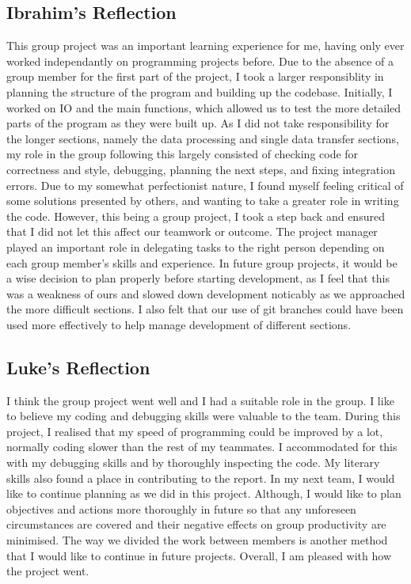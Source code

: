 \documentclass[11pt]{article}
\begin{document}
\subsection{Ibrahim's Reflection}
This group project was an important learning experience for me, having only ever worked independantly on programming projects before. Due to the absence of a group member for the first part of the project, I took a larger responsiblity in planning the structure of the program and building up the codebase. Initially, I worked on IO and the main functions, which allowed us to test the more detailed parts of the program as they were built up. As I did not take responsibility for the longer sections, namely the data processing and single data transfer sections, my role in the group following this largely consisted of checking code for correctness and style, debugging, planning the next steps, and fixing integration errors. Due to my somewhat perfectionist nature, I found myself feeling critical of some solutions presented by others, and wanting to take a greater role in writing the code. However, this being a group project, I took a step back and ensured that I did not let this affect our teamwork or outcome. The project manager played an important role in delegating tasks to the right person depending on each group member's skills and experience. In future group projects, it would be a wise decision to plan properly before starting development, as I feel that this was a weakness of ours and slowed down development noticably as we approached the more difficult sections. I also felt that our use of git branches could have been used more effectively to help manage development of different sections.

\subsection{Luke's Reflection}
I think the group project went well and I had a suitable role in the group.
I like to believe my coding and debugging skills were valuable to the team.
During this project, I realised that my speed of programming could be improved by a lot,
normally coding slower than the rest of my teammates. I accommodated for this
with my debugging skills and by thoroughly inspecting the code.
My literary skills also found a place in contributing to the report.
In my next team, I would like to continue planning as we did in this project.
Although, I would like to plan objectives and actions more thoroughly in future so that
any unforeseen circumstances are covered and their negative effects on group productivity are minimised. The way we divided the work between members is another
method that I would like to continue in future projects.
Overall, I am pleased with how the project went.
\end{document}
